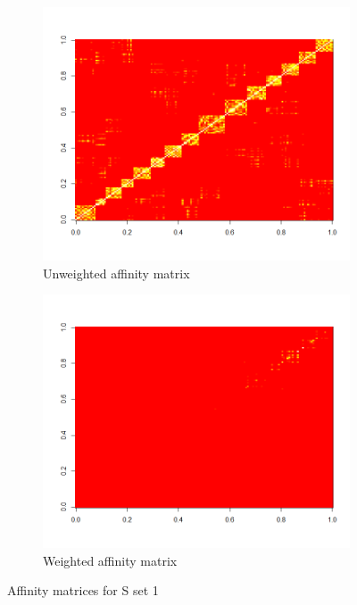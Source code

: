 \begin{figure}[h!]
  \centering
  \begin{subfigure}{0.45\textwidth}
    \centering
    \includegraphics[width = \textwidth, height = \textwidth]{s_set/s_set_1_unweighted_affinity.png}
    \caption{Unweighted affinity matrix}
  \label{fig:unweighted_affinity}
  \end{subfigure}
  \begin{subfigure}{0.45\textwidth}
    \centering
    \includegraphics[width = \textwidth, height = \textwidth]{s_set/s_set_1_weighted_affinity.png}
  \caption{Weighted affinity matrix}
  \label{fig:weighted_affinity}
  \end{subfigure}
    \caption{Affinity matrices for S set 1}
  \label{fig:set_1_affinities}
\end{figure}


